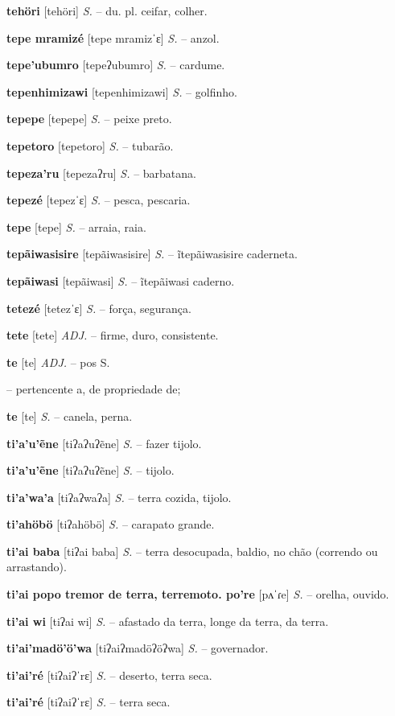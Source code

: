 {{{\textbf{tehöri} [tehöri] \textit{S.} -- du. pl. ceifar, colher.

\textbf{tepe mramizé} [tepe mramizˈɛ] \textit{S.} -- anzol.

\textbf{tepe'ubumro} [tepeʔubumro] \textit{S.} -- cardume.

\textbf{tepenhimizawi} [tepenhimizawi] \textit{S.} -- golfinho.

\textbf{tepepe} [tepepe] \textit{S.} -- peixe preto.

\textbf{tepetoro} [tepetoro] \textit{S.} -- tubarão.

\textbf{tepeza'ru} [tepezaʔru] \textit{S.} -- barbatana.

\textbf{tepezé} [tepezˈɛ] \textit{S.} -- pesca, pescaria.

\textbf{tepe} [tepe] \textit{S.} -- arraia, raia.

\textbf{tepãiwasisire} [tepãiwasisire] \textit{S.} -- ĩtepãiwasisire caderneta.

\textbf{tepãiwasi} [tepãiwasi] \textit{S.} -- ĩtepãiwasi caderno.

\textbf{tetezé} [tetezˈɛ] \textit{S.} -- força, segurança.

\textbf{tete} [tete] \textit{ADJ.} -- firme, duro, consistente. 

\textbf{te} [te] \textit{ADJ.} -- pos S.} -- pertencente a, de propriedade de;

\textbf{te} [te] \textit{S.} -- canela, perna.

\textbf{ti'a'u'ẽne} [tiʔaʔuʔẽne] \textit{S.} -- fazer tijolo.

\textbf{ti'a'u'ẽne} [tiʔaʔuʔẽne] \textit{S.} -- tijolo.

\textbf{ti'a'wa'a} [tiʔaʔwaʔa] \textit{S.} -- terra cozida, tijolo.

\textbf{ti'ahöbö} [tiʔahöbö] \textit{S.} -- carapato grande.

\textbf{ti'ai baba} [tiʔai baba] \textit{S.} -- terra desocupada, baldio, no chão (correndo ou arrastando).

\textbf{ti'ai popo tremor de terra, terremoto. po're} [pʌˈɾe] \textit{S.} -- orelha, ouvido.

\textbf{ti'ai wi} [tiʔai wi] \textit{S.} -- afastado da terra, longe da terra, da terra.

\textbf{ti'ai'madö'ö'wa} [tiʔaiʔmadöʔöʔwa] \textit{S.} -- governador.

\textbf{ti'ai'ré} [tiʔaiʔˈrɛ] \textit{S.} -- deserto, terra seca.

\textbf{ti'ai'ré} [tiʔaiʔˈrɛ] \textit{S.} -- terra seca.

}}
